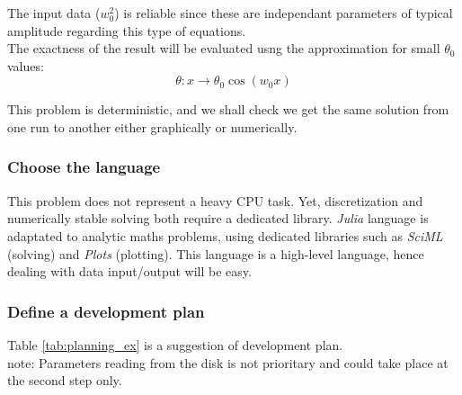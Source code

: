 \documentclass[11pt]{article}
\begin{document}
				The input data ($w_0^2$) is reliable since these are independant parameters of typical amplitude regarding this type of equations. \\

				The exactness of the result will be evaluated usng the approximation for small $\theta_0$ values:
				\begin{equation*}
					\theta: x \rightarrow \theta_0 \cos(w_0x)
				\end{equation*}

				This problem is deterministic, and we shall check we get the same solution from one run to another either graphically or numerically.

			\subsubsection{Choose the language}
				This problem does not represent a heavy CPU task. Yet, discretization and numerically stable solving both require a dedicated library.
				\textit{Julia} language is adaptated to analytic maths problems, using dedicated libraries such as 
                \textit{SciML} (solving) and \textit{Plots} (plotting). This language is a high-level language, hence dealing with data input/output will be easy.

			\subsubsection{Define a development plan}
				Table \ref{tab:planning_ex} is a suggestion of development plan. \\
                note: Parameters reading from the disk is not prioritary and could take place at the second step only.
\end{document}
